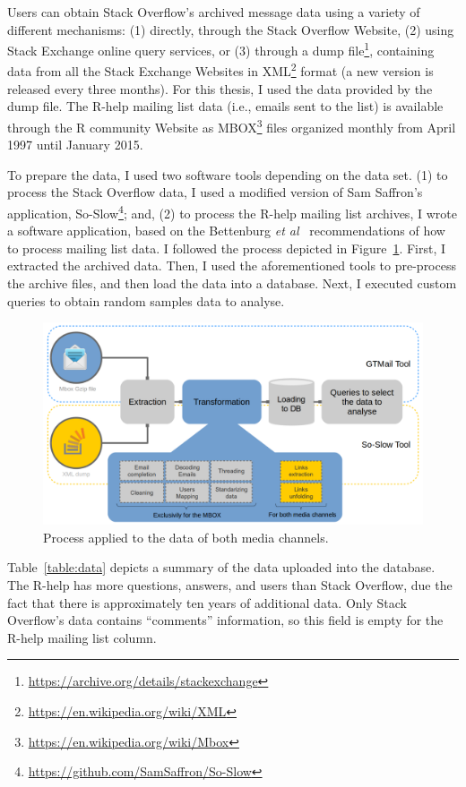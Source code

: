 \documentclass{sig-alternate-05-2015}
\begin{document}
	Users can obtain Stack Overflow's archived message data using a variety of different mechanisms:
	(1) directly, through the Stack Overflow Website,
	(2) using Stack Exchange online query services, or
	(3) through a dump file\footnote{\url{https://archive.org/details/stackexchange}}, containing data from all the Stack Exchange Websites in XML\footnote{\url{https://en.wikipedia.org/wiki/XML}} format (a new version is released every three months).
	For this thesis, I used the data provided by the dump file.
	The R-help mailing list data (i.e., emails sent to the list) is available through the R community Website as MBOX\footnote{\url{https://en.wikipedia.org/wiki/Mbox}} files organized monthly from April 1997 until January 2015.

	To prepare the data, I used two software tools depending on the data set.
	(1) to process the Stack Overflow data, I used a modified version of Sam Saffron's application, So-Slow\footnote{\url{https://github.com/SamSaffron/So-Slow}}; and,
	(2) to process the R-help mailing list archives, I wrote a software application, based on the Bettenburg \textit{et al}~\cite{Bettenburg2009} recommendations of how to process mailing list data.
	I followed the process depicted in Figure~\ref{fig:data_extraction}.
	First, I extracted the archived data.
	Then, I used the aforementioned tools to pre-process the archive files, and then load the data into a database. 
	Next, I executed custom queries to obtain random samples data to analyse.

	\begin{figure}[!htb]
		\centering
		\includegraphics[width=\columnwidth]{Figures/data_extraction}
		\caption[Data process]{Process applied to the data of both media channels.}
		\label{fig:data_extraction}
	\end{figure}

	Table~\ref{table:data} depicts a summary of the data uploaded into the database. 
	The R-help has more questions, answers, and users than Stack Overflow, due the fact that there is approximately ten years of additional data.
	Only Stack Overflow's data contains ``comments'' information, so this field is empty for the R-help mailing list column.
\end{document}
